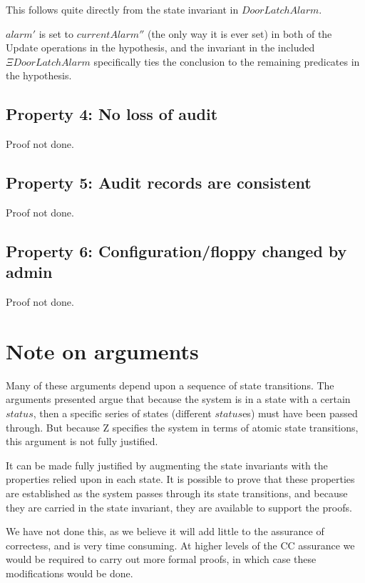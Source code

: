This follows quite directly from the state invariant in $DoorLatchAlarm$.

$alarm'$ is set to $currentAlarm''$ (the only way it is ever set)
in both of the Update operations in the hypothesis,
and the invariant in the included $\Xi DoorLatchAlarm$ specifically
ties the conclusion to the remaining predicates in the hypothesis.

\subsection{Property 4: No loss of audit}
\label{sec:AuditLossArg}
Proof not done.
\subsection{Property 5: Audit records are consistent}
\label{sec:AuditLinksArg}
Proof not done.
\subsection{Property 6: Configuration/floppy changed by admin}
\label{sec:ConfigArg}
Proof not done.
\section{Note on arguments}
\label{sec:NoteArg}
Many of these arguments depend upon a sequence of state transitions.
The arguments presented argue that because the system is in a state with
a certain $status$,
then a specific series of states (different $status$es) must have been passed
through.
But because Z specifies the system in terms of atomic state transitions,
this argument is not fully justified.

It can be made fully justified by augmenting the state invariants
with the properties relied upon in each state.
It is possible to prove that these properties are established as the
system passes through its state transitions,
and because they are carried in the state invariant,
they are available to support the proofs.

We have not done this,
as we believe it will add little to the assurance of correctess,
and is very time consuming.
At higher levels of the CC assurance we would be required to carry out
more formal proofs,
in which case these modifications would be done.

